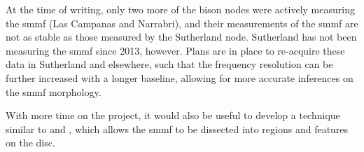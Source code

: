 At the time of writing, only two more of the \gls{bison} nodes were actively measuring the \gls{smmf} (Las Campanas and Narrabri), and their measurements of the \gls{smmf} are not as stable as those measured by the Sutherland node. Sutherland has not been measuring the \gls{smmf} since 2013, however. Plans are in place to re-acquire these data in Sutherland and elsewhere, such that the frequency resolution can be further increased with a longer baseline, allowing for more accurate inferences on the \gls{smmf} morphology.

With more time on the project, it would also be useful to develop a technique similar to \citet{kutsenko_contribution_2017} and \citet{bose_variability_2018}, which allows the \gls{smmf} to be dissected into regions and features on the disc.









